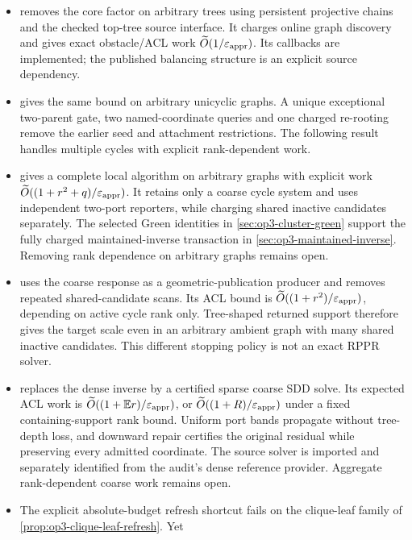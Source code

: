 \documentclass[11pt]{article}
\begin{document}
\begin{itemize}
response producer must therefore handle unfinished branching cores as well.
\item {} removes the core factor on arbitrary
trees using persistent projective chains and the checked top-tree source
interface. It charges online graph discovery and gives exact obstacle/ACL
work $\widetilde O(1/\varepsilon_{\mathrm{appr}})$. Its callbacks are implemented; the
published balancing structure is an explicit source dependency.
\item {} gives the same bound on arbitrary
unicyclic graphs. A unique exceptional two-parent gate, two named-coordinate
queries and one charged re-rooting remove the earlier seed and attachment
restrictions. The following result handles multiple cycles with explicit
rank-dependent work.
\item {} gives a complete local algorithm on
arbitrary graphs with explicit work
$\widetilde O((1+r^2+q)/\varepsilon_{\mathrm{appr}})$. It retains only a coarse cycle system
and uses independent two-port reporters, while charging shared inactive
candidates separately. The selected Green identities in
\cref{sec:op3-cluster-green} support the fully charged maintained-inverse
transaction in \cref{sec:op3-maintained-inverse}. Removing rank dependence
on arbitrary graphs remains open.
\item {} uses the coarse response as a
geometric-publication producer and removes repeated shared-candidate scans.
Its ACL bound is $\widetilde O((1+r^2)/\varepsilon_{\mathrm{appr}})$, depending on active
cycle rank only. Tree-shaped returned support therefore gives the target
scale even in an arbitrary ambient graph with many shared inactive
candidates. This different stopping policy is not an exact RPPR solver.
\item {} replaces the dense inverse by a
certified sparse coarse SDD solve. Its expected ACL work is
$\widetilde O((1+\mathbb E r)/\varepsilon_{\mathrm{appr}})$, or
$\widetilde O((1+R)/\varepsilon_{\mathrm{appr}})$ under a fixed containing-support rank bound.
Uniform port bands propagate without tree-depth loss, and downward repair
certifies the original residual while preserving every admitted coordinate.
The source solver is imported and separately identified from the audit's
dense reference provider. Aggregate rank-dependent coarse work remains open.
\item The explicit absolute-budget refresh shortcut fails on the clique-leaf
family of \cref{prop:op3-clique-leaf-refresh}. Yet

\end{itemize}
\end{document}
